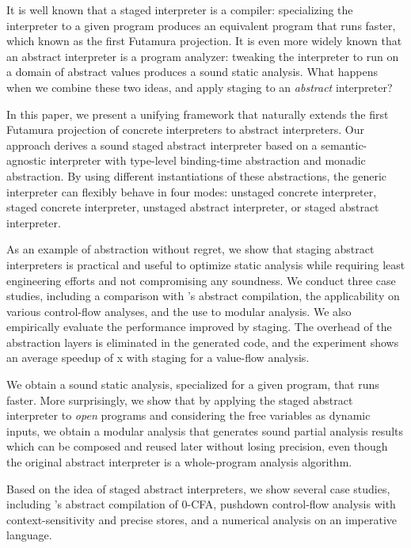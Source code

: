 It is well known that a staged interpreter is a compiler: specializing the
interpreter to a given program produces an equivalent program that runs faster,
which known as the first Futamura projection. It is even more widely known that an
abstract interpreter is a program analyzer: tweaking the interpreter to run on a
domain of abstract values produces a sound static analysis. What happens when we
combine these two ideas, and apply staging to an \emph{abstract} interpreter?

In this paper, we present a unifying framework that naturally extends the first
Futamura projection of concrete interpreters to abstract interpreters. Our
approach derives a sound staged abstract interpreter based on a
semantic-agnostic interpreter with type-level binding-time abstraction and
monadic abstraction. By using different instantiations of these abstractions,
the generic interpreter can flexibly behave in four modes: unstaged concrete
interpreter, staged concrete interpreter, unstaged abstract interpreter, or
staged abstract interpreter.

As an example of abstraction without regret, we show that staging abstract
interpreters is practical and useful to optimize static analysis while requiring
least engineering efforts and not compromising any soundness. We conduct three
case studies, including a comparison with
\citeauthor{Boucher:1996:ACN:647473.727587}'s abstract compilation,
the applicability on various control-flow analyses, and the use to modular
analysis. We also empirically evaluate the performance improved by staging. The
overhead of the abstraction layers is eliminated in the generated code, and the 
experiment shows an average speedup of x with staging for a value-flow analysis.

\iffalse
We obtain a sound static analysis, specialized for
a given program, that runs faster. More surprisingly, we show that by applying
the staged abstract interpreter to \textit{open} programs and considering the
free variables as dynamic inputs, we obtain a modular analysis that generates
sound partial analysis results which can be composed and reused later without
losing precision, even though the original abstract interpreter is a
whole-program analysis algorithm.

Based on the idea of staged abstract interpreters, we show several case studies,
including \citeauthor{Boucher:1996:ACN:647473.727587}'s abstract compilation of
0-CFA, pushdown control-flow analysis with context-sensitivity and precise
stores, and a numerical analysis on an imperative language.


